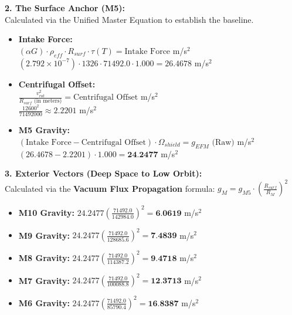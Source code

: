 \documentclass[11pt, a4paper]{article}
\begin{document}
  \vspace{1.0em}
  \noindent \textbf{2. The Surface Anchor (M5):} \\
  \hspace*{1em} Calculated via the Unified Master Equation to establish the baseline.
  \begin{itemize}
    \item \textbf{Intake Force:} \\[0.5em]
    \hspace*{2em} $(\alpha G) \cdot \rho_{eff} \cdot R_{surf} \cdot \tau(T) = \text{Intake Force}$ m/s$^2$ \\[1em]
    \hspace*{2em} $(2.792 \times 10^{-7}) \cdot 1326 \cdot 71492.0 \cdot 1.000 = 26.4678$ m/s$^2$
    
    \item \textbf{Centrifugal Offset:} \\[0.5em]
    \hspace*{2em} $\frac{v_{rot}^2}{R_{surf} \text{ (in meters)}} = \text{Centrifugal Offset}$ m/s$^2$ \\[1em]
    \hspace*{2em} $\frac{12600^2}{71492000} \approx 2.2201$ m/s$^2$
    
    \item \textbf{M5 Gravity:} \\[0.5em]
    \hspace*{2em} $(\text{Intake Force} - \text{Centrifugal Offset}) \cdot \Omega_{shield} = g_{EFM} \text{ (Raw)}$ m/s$^2$ \\[1em]
    \hspace*{2em} $(26.4678 - 2.2201) \cdot 1.000 = \textbf{24.2477}$ m/s$^2$
  \end{itemize}

  \clearpage
  \noindent \textbf{3. Exterior Vectors (Deep Space to Low Orbit):} \\
  \hspace*{1em} Calculated via the \textbf{Vacuum Flux Propagation} formula: $g_M = g_{M5} \cdot \left( \frac{R_{surf}}{R_M} \right)^2$
  \begin{itemize}
    \item \textbf{M10 Gravity:} $24.2477 \left( \frac{71492.0}{142984.0} \right)^2 = \textbf{6.0619}$ m/s$^2$
    \item \textbf{M9 Gravity:} $24.2477 \left( \frac{71492.0}{128685.6} \right)^2 = \textbf{7.4839}$ m/s$^2$
    \item \textbf{M8 Gravity:} $24.2477 \left( \frac{71492.0}{114387.2} \right)^2 = \textbf{9.4718}$ m/s$^2$
    \item \textbf{M7 Gravity:} $24.2477 \left( \frac{71492.0}{100088.8} \right)^2 = \textbf{12.3713}$ m/s$^2$
    \item \textbf{M6 Gravity:} $24.2477 \left( \frac{71492.0}{85790.4} \right)^2 = \textbf{16.8387}$ m/s$^2$
  \end{itemize}
\end{document}

